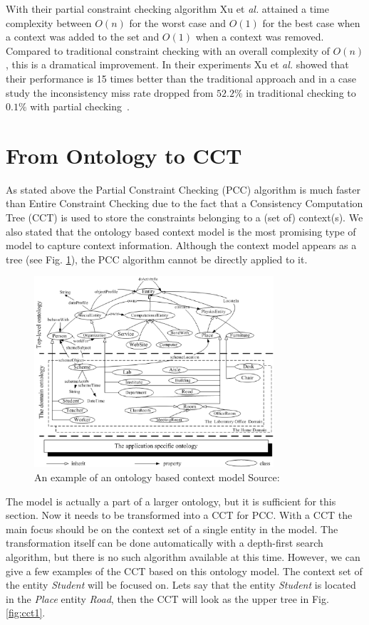 \documentclass[journal]{vgtc}                %
\begin{document}
With their partial constraint checking algorithm Xu et \textit{al.} attained a time complexity between $O(n)$ for the worst case and $O(1)$ for the best case when a context was added to the set and $O(1)$ when a context was removed. Compared to traditional constraint checking with an overall complexity of $O(n)$, this is a dramatical improvement. In their experiments Xu et \textit{al.} showed that their performance is 15 times better than the traditional approach and in a case study the inconsistency miss rate dropped from $52.2\%$ in traditional checking to $0.1\%$ with partial checking~\cite{xu:2010:PCC}.

\section{From Ontology to CCT}
As stated above the Partial Constraint Checking (PCC) algorithm is much faster than Entire Constraint Checking due to the fact that a Consistency Computation Tree (CCT) is used to store the constraints belonging to a (set of) context(s). We also stated that the ontology based context model is the most promising type of model to capture context information. Although the context model appears as a tree (see Fig. \ref{fig:ont}), the PCC algorithm cannot be directly applied to it.

\begin{figure}[htb]
  \centering
  \includegraphics[width=3.5in]{Ontology.eps}
  \caption{An example of an ontology based context model Source:~\cite{bu:2006:CCM}}
  \label{fig:ont}
\end{figure}

The model is actually a part of a larger ontology, but it is sufficient for this section. Now it needs to be transformed into a CCT for PCC. With a CCT the main focus should be on the context set of a single entity in the model. The transformation itself can be done automatically with a depth-first search algorithm, but there is no such algorithm available at this time. However, we can give a few examples of the CCT based on this ontology model. The context set of the entity \textit{Student} will be focused on. Lets say that the entity \textit{Student} is located in the \textit{Place} entity \textit{Road}, then the CCT will look as the upper tree in Fig. \ref{fig:cct1}.
\end{document}
